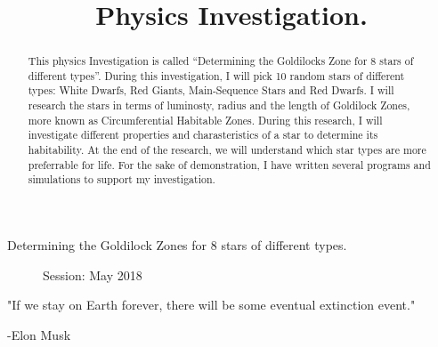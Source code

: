 \documentclass{IEEEtran}
\title{Physics Investigation.}
\date{}
\author{}
\begin{document}
\maketitle
\begin{center}
  Determining the Goldilock Zones for 8 stars of different types.\\
\end{center}


\begin{figure}
  \begin{flushleft}
    Session: May 2018\\
    \end{flushleft}
  \end{figure}


\begin{abstract}
  This physics Investigation is called ``Determining the Goldilocks Zone for 8 stars of different types''.
  During this investigation, I will pick 10 random stars of different types: White Dwarfs, Red Giants, Main-Sequence Stars and Red Dwarfs.
  I will research the stars in terms of luminosty, radius and the length of Goldilock Zones, more known as Circumferential Habitable Zones.
  During this research, I will investigate different properties and charasteristics of a star to determine its habitability.
  At the end of the research, we will understand which star types are more preferrable for life.
  For the sake of demonstration, I have written several programs and simulations to support my investigation. 
\end{abstract}


\tableofcontents

{}

\newpage
\begin{center}
  "If we stay on Earth forever, there will be some eventual extinction event." 
\end{center}
\begin{flushright}
  -Elon Musk \cite{musk}
\end{flushright}

  
\end{document}
